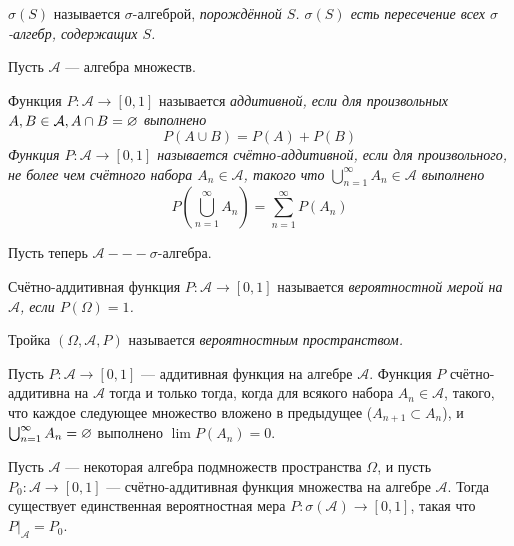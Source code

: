 \begin{definition}
    $\sigma(S)$ называется $\sigma$-алгеброй, \it{порождённой} $S$. $\sigma(S)$ есть пересечение всех
    $\sigma$-алгебр, содержащих $S$.
\end{definition}
Пусть $\mathcal{A}$ --- алгебра множеств.
\begin{definition}
    Функция $P \colon \mathcal{A} \to [0, 1]$ называется \it{аддитивной}, если для произвольных $A, B \in \mathcal{A},
    A \cap B = \varnothing$ выполнено
    \[
        P(A \cup B) = P(A) + P(B)
    \]
    Функция $P \colon \mathcal{A} \to [0, 1]$ называется \it{счётно-аддитивной}, если для произвольного, не более чем
    счётного набора $A_n \in \mathcal{A}$, такого что $\bigcup_{n = 1}^{\infty} A_n \in  \mathcal{A}$ выполнено
    \[
        P \left( \bigcup_{n = 1}^{\infty} A_n \right) = \sum\limits_{n=1}^{\infty} P(A_n)
    \]
\end{definition}
Пусть теперь $\mathcal{A} --- \sigma$-алгебра.
\begin{definition}
    Счётно-аддитивная функция $P \colon \mathcal{A} \to [0, 1]$ называется \it{вероятностной мерой} на $\mathcal{A}$,
    если $P(\Omega) = 1$.
\end{definition}
\begin{definition}
    Тройка $\left( \Omega, \mathcal{A}, P \right)$ называется \it{вероятностным пространством}.
\end{definition}
\begin{proposal}
    Пусть $P \colon \mathcal{A} \to [0, 1]$ --- аддитивная функция на алгебре $\mathcal{A}$. Функция $P$ счётно-аддитивна
    на $\mathcal{A}$ тогда и только тогда, когда для всякого набора $A_n \in \mathcal{A}$, такого, что каждое следующее
    множество вложено в предыдущее ($A_{n + 1} \subset A_n$), и $\bigcup_{n=1}^{\infty} A_n = \varnothing$ выполнено
    $\lim P(A_n) = 0$.
\end{proposal}
\begin{theorem}
    Пусть $\mathcal{A}$ --- некоторая алгебра подмножеств пространства $\Omega$, и пусть $P_0 \colon \mathcal{A} \to
    [0, 1]$ --- счётно-аддитивная функция множества на алгебре $\mathcal{A}$. Тогда существует единственная вероятностная мера
    $P \colon \sigma(\mathcal{A}) \to [0, 1]$, такая что $P\Big|_{\mathcal{A}} = P_0$.
\end{theorem}

